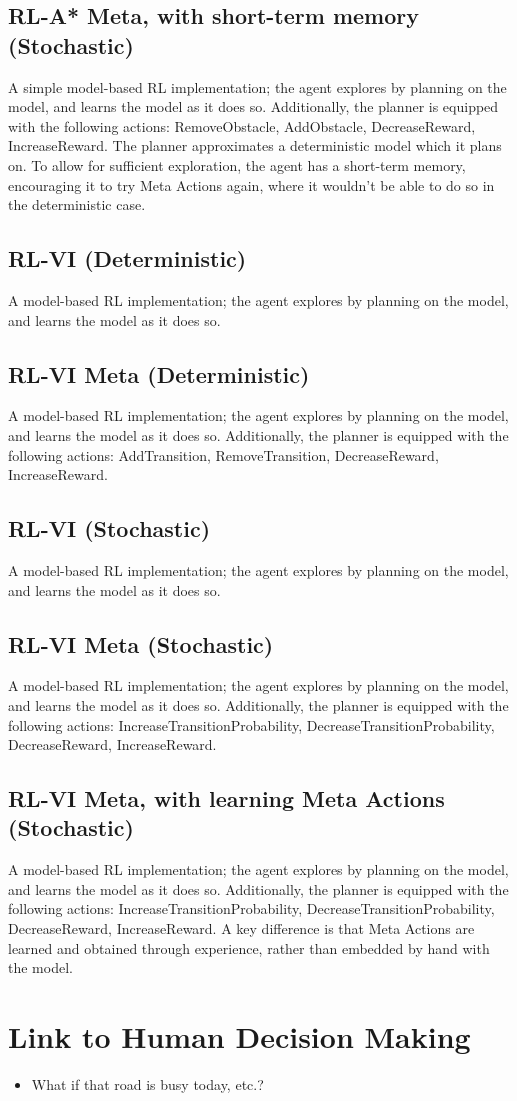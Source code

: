 \subsection{RL-A* Meta, with short-term memory (Stochastic)}
A simple model-based RL implementation; the agent explores by planning on the model, and learns the model as it does so.
Additionally, the planner is equipped with the following actions: RemoveObstacle, AddObstacle, DecreaseReward, IncreaseReward. The planner approximates a deterministic model which it plans on. To allow for sufficient exploration, the agent has a short-term memory, encouraging it to try Meta Actions again, where it wouldn't be able to do so in the deterministic case.
\subsection{RL-VI (Deterministic)}
A model-based RL implementation; the agent explores by planning on the model, and learns the model as it does so.
\subsection{RL-VI Meta (Deterministic)}
A model-based RL implementation; the agent explores by planning on the model, and learns the model as it does so.
Additionally, the planner is equipped with the following actions: AddTransition, RemoveTransition, DecreaseReward, IncreaseReward.
\subsection{RL-VI (Stochastic)}
A model-based RL implementation; the agent explores by planning on the model, and learns the model as it does so.
\subsection{RL-VI Meta (Stochastic)}
A model-based RL implementation; the agent explores by planning on the model, and learns the model as it does so.
Additionally, the planner is equipped with the following actions: IncreaseTransitionProbability, DecreaseTransitionProbability, DecreaseReward, IncreaseReward.
\subsection{RL-VI Meta, with learning Meta Actions (Stochastic)}
A model-based RL implementation; the agent explores by planning on the model, and learns the model as it does so.
Additionally, the planner is equipped with the following actions: IncreaseTransitionProbability, DecreaseTransitionProbability, DecreaseReward, IncreaseReward. A key difference is that Meta Actions are learned and obtained through experience, rather than embedded by hand with the model.
\section{Link to Human Decision Making}
\begin{itemize}
    \item What if that road is busy today, etc.?
\end{itemize}